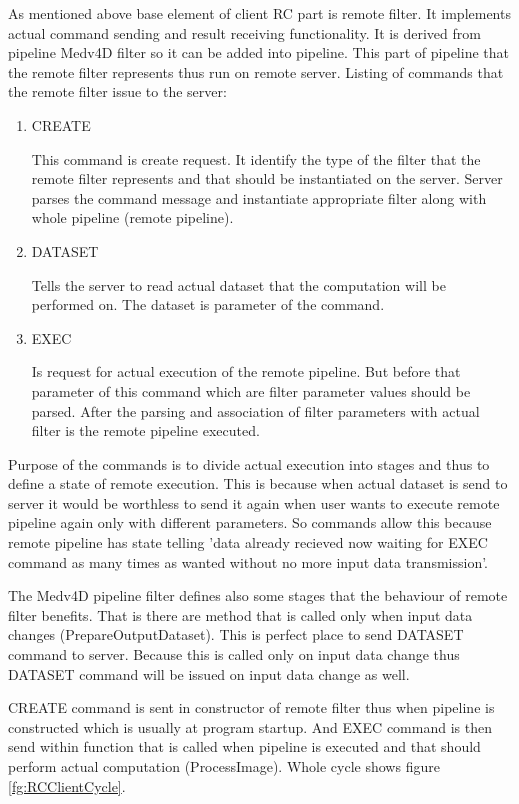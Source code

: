 As mentioned above base element of client RC part is remote filter.
It implements actual command sending and result receiving functionality.
It is derived from pipeline Medv4D filter so it can be added into pipeline.
This part of pipeline that the remote filter represents thus run on remote server.
Listing of commands that the remote filter issue to the server:
\begin{enumerate}
  \item{CREATE}
  \par
  This command is create request.
It identify the type of the filter that the remote filter represents and that should be instantiated on the server.
Server parses the command message and instantiate appropriate filter along with whole pipeline (remote pipeline).

  \item{DATASET}
  \par
  Tells the server to read actual dataset that the computation will be performed on.
The dataset is parameter of the command.

  \item{EXEC}
\par
  Is request for actual execution of the remote pipeline.
But before that parameter of this command which are filter parameter values should be parsed.
After the parsing and association of filter parameters with actual filter is the remote pipeline executed.
\end{enumerate}

\par
Purpose of the commands is to divide actual execution into stages and thus to define a state of remote execution.
This is because when actual dataset is send to server it would be worthless to send it again when user wants to execute remote pipeline again only with different parameters.
So commands allow this because remote pipeline has state telling 'data already recieved now waiting for EXEC command as many times as wanted without no more input data transmission'.
\par
The Medv4D pipeline filter defines also some stages that the behaviour of remote filter benefits.
That is there are method that is called only when input data changes (PrepareOutputDataset).
This is perfect place to send DATASET command to server.
Because this is called only on input data change thus DATASET command will be issued on input data change as well.
\par
CREATE command is sent in constructor of remote filter thus when pipeline is constructed which is usually at program startup.
And EXEC command is then send within function that is called when pipeline is executed and that should perform actual computation (ProcessImage).
Whole cycle shows figure \ref{fg:RCClientCycle}.


